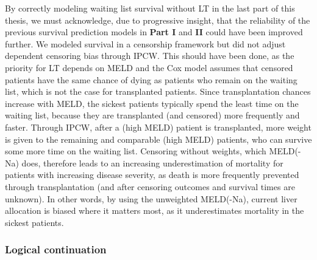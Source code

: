 \documentclass[11pt,english,]{book} %
\begin{document}
By correctly modeling waiting list survival without LT in the last part of this thesis, we must acknowledge, due to progressive insight, that the reliability of the previous survival prediction models in \textbf{Part I} and \textbf{II} could have been improved further. We modeled survival in a censorship framework but did not adjust dependent censoring bias through IPCW. This should have been done, as the priority for LT depends on MELD and the Cox model assumes that censored patients have the same chance of dying as patients who remain on the waiting list, which is not the case for transplanted patients. Since transplantation chances increase with MELD, the sickest patients typically spend the least time on the waiting list, because they are transplanted (and censored) more frequently and faster. Through IPCW, after a (high MELD) patient is transplanted, more weight is given to the remaining and comparable (high MELD) patients, who can survive some more time on the waiting list. Censoring without weights, which MELD(-Na) does, therefore leads to an increasing underestimation of mortality for patients with increasing disease severity, as death is more frequently prevented through transplantation (and after censoring outcomes and survival times are unknown). In other words, by using the unweighted MELD(-Na), current liver allocation is biased where it matters most, as it underestimates mortality in the sickest patients.

\hypertarget{logical-continuation}{%
\subsubsection*{Logical continuation}\label{logical-continuation}}
\end{document}
